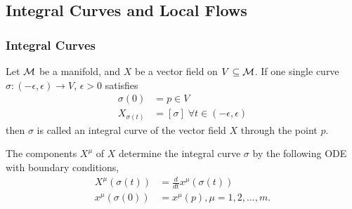 \documentclass[../main.tex]{subfiles}
\begin{document}
    \newpage
    \subsection{Integral Curves and Local Flows}
    \subsubsection{Integral Curves}
    \begin{definition}\label{def:integral-curve}
        Let \(\manifold[M]\) be a manifold, and \(X\) be a vector field on 
        \(V \subseteq \manifold[M]\).
        If one single curve \(\sigma : (-\epsilon, \epsilon) \to V\), 
        \(\epsilon > 0\) satisfies 
        \[
        \begin{aligned}
            \sigma(0) &= p \in V \\
            X_{\sigma(t)} &= [\sigma]\; \forall t \in (-\epsilon, \epsilon)
        \end{aligned}
        \]
        then \(\sigma\) is called an integral curve of the vector field \(X\) 
        through the point \(p\).
    \end{definition}
    \begin{theorem}\label{thm:de-int-curve}
        The components \(X^\mu\) of \(X\) determine the integral curve \(\sigma\) 
        by the following ODE with boundary conditions, 
        \[
        \begin{aligned}
            X^\mu(\sigma(t)) &= \frac{d}{dt}x^\mu(\sigma(t)) \\
            x^\mu(\sigma(0)) &= x^\mu(p), \mu = 1, 2, \dots, m.
        \end{aligned}
        \]
    \end{theorem}
\end{document}
